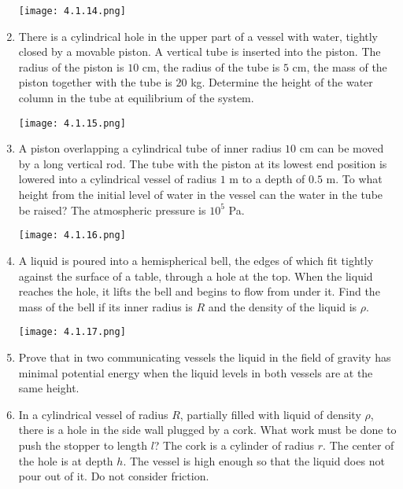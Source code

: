 \documentclass{article}
\begin{document}
\begin{enumerate}[label=4.1.\arabic*]
\begin{center}
    \texttt{[image: 4.1.14.png]}
\end{center}



\item There is a cylindrical hole in the upper part of a vessel with water, tightly closed by a movable piston. A vertical tube is inserted into the piston. The radius of the piston is $10$ cm, the radius of the tube is $5$ cm, the mass of the piston together with the tube is $20$ kg. Determine the height of the water column in the tube at equilibrium of the system.  

\begin{center}
    \texttt{[image: 4.1.15.png]}
\end{center}

\item A piston overlapping a cylindrical tube of inner radius $10$ cm can be moved by a long vertical rod. The tube with the piston at its lowest end position is lowered into a cylindrical vessel of radius $1$ m to a depth of $0.5$ m. To what height from the initial level of water in the vessel can the water in the tube be raised? The atmospheric pressure is $10^5$ Pa.   


\begin{center}
    \texttt{[image: 4.1.16.png]}
\end{center}


\item A liquid is poured into a hemispherical bell, the edges of which fit tightly against the surface of a table, through a hole at the top. When the liquid reaches the hole, it lifts the bell and begins to flow from under it. Find the mass of the bell if its inner radius is $R$ and the density of the liquid is $\rho$.  
\begin{center}
    \texttt{[image: 4.1.17.png]}
\end{center}


\item Prove that in two communicating vessels the liquid in the field of gravity has minimal potential energy when the liquid levels in both vessels are at the same height.




\item In a cylindrical vessel of radius $R$, partially filled with liquid of density $\rho$, there is a hole in the side wall plugged by a cork. What work must be done to push the stopper to length $l$? The cork is a cylinder of radius $r$. The center of the hole is at depth $h$. The vessel is high enough so that the liquid does not pour out of it. Do not consider friction. 


\end{enumerate}
\end{document}
